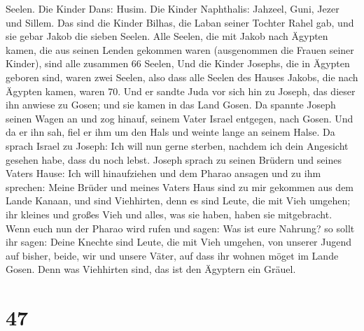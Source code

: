 Seelen.  Die Kinder Dans: Husim.  Die
Kinder Naphthalis: Jahzeel, Guni, Jezer und Sillem.  Das
sind die Kinder Bilhas, die Laban seiner Tochter Rahel gab, und sie
gebar Jakob die sieben Seelen.  Alle Seelen, die mit
Jakob nach Ägypten kamen, die aus seinen Lenden gekommen waren
(ausgenommen die Frauen seiner Kinder), sind alle zusammen 66 Seelen,
 Und die Kinder Josephs, die in Ägypten geboren sind,
waren zwei Seelen, also dass alle Seelen des Hauses Jakobs, die nach
Ägypten kamen, waren 70.  Und er sandte Juda vor sich hin
zu Joseph, das dieser ihn anwiese zu Gosen; und sie kamen in das Land
Gosen.  Da spannte Joseph seinen Wagen an und zog hinauf,
seinem Vater Israel entgegen, nach Gosen. Und da er ihn sah, fiel er ihm
um den Hals und weinte lange an seinem Halse.  Da sprach
Israel zu Joseph: Ich will nun gerne sterben, nachdem ich dein Angesicht
gesehen habe, dass du noch lebst.  Joseph sprach zu
seinen Brüdern und seines Vaters Hause: Ich will hinaufziehen und dem
Pharao ansagen und zu ihm sprechen: Meine Brüder und meines Vaters Haus
sind zu mir gekommen aus dem Lande Kanaan,  und sind
Viehhirten, denn es sind Leute, die mit Vieh umgehen; ihr kleines und
großes Vieh und alles, was sie haben, haben sie mitgebracht.
 Wenn euch nun der Pharao wird rufen und sagen: Was ist
eure Nahrung?  so sollt ihr sagen: Deine Knechte sind
Leute, die mit Vieh umgehen, von unserer Jugend auf bisher, beide, wir
und unsere Väter, auf dass ihr wohnen möget im Lande Gosen. Denn was
Viehhirten sind, das ist den Ägyptern ein Gräuel.

\hypertarget{section-46}{%
\section{47}\label{section-46}}

